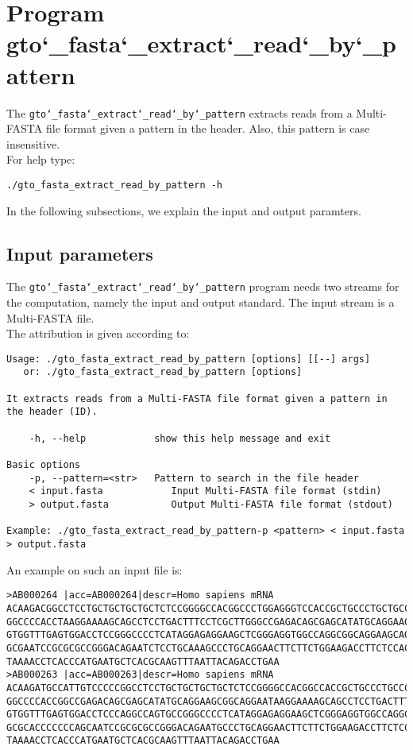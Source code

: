 \section{Program gto\char`_fasta\char`_extract\char`_read\char`_by\char`_pattern}
The \texttt{gto\char`_fasta\char`_extract\char`_read\char`_by\char`_pattern} extracts reads from a Multi-FASTA file format given a pattern in the header. Also, this pattern is case insensitive. \\
For help type:
\begin{lstlisting}
./gto_fasta_extract_read_by_pattern -h
\end{lstlisting}
In the following subsections, we explain the input and output paramters.

\subsection*{Input parameters}

The \texttt{gto\char`_fasta\char`_extract\char`_read\char`_by\char`_pattern} program needs two streams for the computation, namely the input and output standard. The input stream is a Multi-FASTA file.\\
The attribution is given according to:
\begin{lstlisting}
Usage: ./gto_fasta_extract_read_by_pattern [options] [[--] args]
   or: ./gto_fasta_extract_read_by_pattern [options]

It extracts reads from a Multi-FASTA file format given a pattern in the header (ID).

    -h, --help            show this help message and exit

Basic options
    -p, --pattern=<str>   Pattern to search in the file header
    < input.fasta            Input Multi-FASTA file format (stdin)
    > output.fasta           Output Multi-FASTA file format (stdout)

Example: ./gto_fasta_extract_read_by_pattern-p <pattern> < input.fasta > output.fasta
\end{lstlisting}
An example on such an input file is:
\begin{lstlisting}
>AB000264 |acc=AB000264|descr=Homo sapiens mRNA 
ACAAGACGGCCTCCTGCTGCTGCTGCTCTCCGGGGCCACGGCCCTGGAGGGTCCACCGCTGCCCTGCTGCCATTGTCCCC
GGCCCCACCTAAGGAAAAGCAGCCTCCTGACTTTCCTCGCTTGGGCCGAGACAGCGAGCATATGCAGGAAGCGGCAGGAA
GTGGTTTGAGTGGACCTCCGGGCCCCTCATAGGAGAGGAAGCTCGGGAGGTGGCCAGGCGGCAGGAAGCAGGCCAGTGCC
GCGAATCCGCGCGCCGGGACAGAATCTCCTGCAAAGCCCTGCAGGAACTTCTTCTGGAAGACCTTCTCCACCCCCCCAGC
TAAAACCTCACCCATGAATGCTCACGCAAGTTTAATTACAGACCTGAA
>AB000263 |acc=AB000263|descr=Homo sapiens mRNA 
ACAAGATGCCATTGTCCCCCGGCCTCCTGCTGCTGCTGCTCTCCGGGGCCACGGCCACCGCTGCCCTGCCCCTGGAGGGT
GGCCCCACCGGCCGAGACAGCGAGCATATGCAGGAAGCGGCAGGAATAAGGAAAAGCAGCCTCCTGACTTTCCTCGCTTG
GTGGTTTGAGTGGACCTCCCAGGCCAGTGCCGGGCCCCTCATAGGAGAGGAAGCTCGGGAGGTGGCCAGGCGGCAGGAAG
GCGCACCCCCCCAGCAATCCGCGCGCCGGGACAGAATGCCCTGCAGGAACTTCTTCTGGAAGACCTTCTCCTCCTGCAAA
TAAAACCTCACCCATGAATGCTCACGCAAGTTTAATTACAGACCTGAA
\end{lstlisting}


